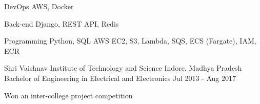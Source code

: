 \documentclass{my_resume}
\begin{document}
	\begin{cvskills}
		\cvskill
			{DevOps} %
			{AWS, Docker} %

		\cvskill
			{Back-end} %
			{Django, REST API, Redis} %

		\cvskill
			{Programming} %
			{Python, SQL} %
		\newline
		\cvskill
		{AWS}
		{EC2, S3, Lambda, SQS, ECS (Fargate), IAM, ECR}
	\end{cvskills}


	\begin{cventries}
		\cventry
			{Shri Vaishnav Institute of Technology and Science} %
			{Indore, Madhya Pradesh} %
			{Bachelor of Engineering in Electrical and Electronics} %
			{Jul 2013 - Aug 2017} %

		\begin{cvitems} %
			\item {Won an inter-college project competition}
		\end{cvitems}
	\end{cventries}
\end{document}
